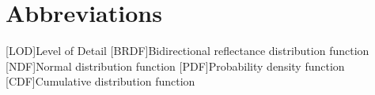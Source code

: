 \chapter*{Abbreviations}
\begin{acronym}[BRDF]
[LOD]{Level of Detail}
[BRDF]{Bidirectional reflectance distribution function}
[NDF]{Normal distribution function}
[PDF]{Probability density function}
[CDF]{Cumulative distribution function}
\end{acronym}